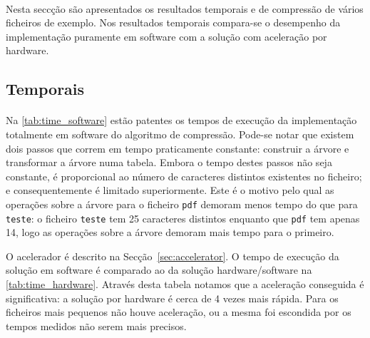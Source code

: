 \paragraph{} Nesta seccção são apresentados os resultados temporais e de compressão de vários ficheiros de exemplo. Nos resultados temporais compara-se o desempenho da implementação puramente em software com a solução com aceleração por hardware.

\subsection{Temporais}

  \paragraph{} Na \autoref{tab:time_software} estão patentes os tempos de execução da implementação totalmente em software do algoritmo de compressão. Pode-se notar que existem dois passos que correm em tempo praticamente constante: construir a árvore e transformar a árvore numa tabela. Embora o tempo destes passos não seja constante, é proporcional ao número de caracteres distintos existentes no ficheiro; e consequentemente é limitado superiormente. Este é o motivo pelo qual as operações sobre a árvore para o ficheiro \texttt{pdf} demoram menos tempo do que para \texttt{teste}: o ficheiro \texttt{teste} tem 25 caracteres distintos enquanto que \texttt{pdf} tem apenas 14, logo as operações sobre a árvore demoram mais tempo para o primeiro.

  O acelerador é descrito na Secção~\ref{sec:accelerator}. O tempo de execução da solução em software é comparado ao da solução hardware/software na \autoref{tab:time_hardware}. Através desta tabela notamos que a aceleração conseguida é significativa: a solução por hardware é cerca de 4 vezes mais rápida. Para os ficheiros mais pequenos não houve aceleração, ou a mesma foi escondida por os tempos medidos não serem mais precisos.


